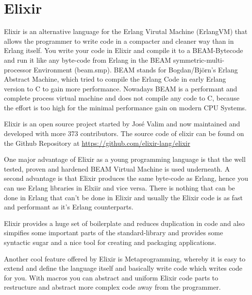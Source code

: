 \section{Elixir}
Elixir is an alternative language for the Erlang Virutal Machine (ErlangVM) that allows the programmer to write code in a compacter and cleaner way than in Erlang itself. You write your code in Elixir and compile it to a BEAM-Bytecode and run it like any byte-code from Erlang in the BEAM symmetric-multi-processor Environment (beam.smp). BEAM stands for Bogdan/Björn's Erlang Abstract Machine, which tried to compile the Erlang Code in early Erlang version to C to gain more performance. Nowadays BEAM is a performant and complete process virtual machine and does not compile any code to C, because the effort is too high for the minimal performance gain on modern CPU Systems.

Elixir is an open source project started by Jos\'e Valim and now maintained and developed with more 373 contributors. The source code of elixir can be found on the Github Repository at \url{https://github.com/elixir-lang/elixir}

One major advantage of Elixir as a young programming language is that the well tested, proven and hardened BEAM Virtual Machine is used underneath. A second advantage is that Elixir produces the same byte-code as Erlang, hence you can use Erlang libraries in Elxiir and vice versa. There is nothing that can be done in Erlang that can't be done in Elixir and usually the Elixir code is as fast and performant as it's Erlang counterparts.

Elixir provides a huge set of boilerplate and reduces duplication in code and also simpifies some important parts of the standard-library and provides some syntactic sugar and a nice tool for creating and packaging applications.

Another cool feature offered by Elixir is Metaprogramming, whereby it is easy to extend and define the language itself and basically write code which writes code for you. With macros you can abstract and uniform Elixir code parts to restructure and abstract more complex code away from the programmer. 
